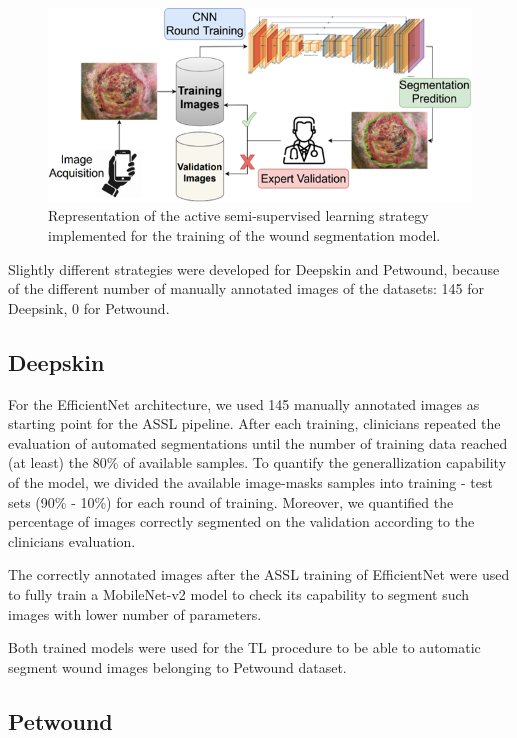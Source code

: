 \documentclass[../main.tex]{subfiles}
\begin{document}
\begin{figure}[H] 
\begin{center}
\includegraphics[width=16cm]{images/ASSL.png}
\caption{\small{Representation of the active semi-supervised learning strategy implemented for the training of the wound segmentation model.}}\label{fig:ASSL}
\end{center}
\end{figure}

Slightly different strategies were developed for Deepskin and Petwound, because of the different number of manually annotated images of the datasets: 145 for Deepsink, 0 for Petwound.

\subsection{Deepskin}

For the EfficientNet architecture, we used 145 manually annotated images as starting point for the ASSL pipeline.
After each training, clinicians repeated the evaluation of automated segmentations until the number of training data reached (at least) the 80\% of available samples.
To quantify the generallization capability of the model, we divided the available image-masks samples into training - test sets (90\% - 10\%) for each round of training.
Moreover, we quantified the percentage of images correctly segmented on the validation according to the clinicians evaluation.

The correctly annotated images after the ASSL training of EfficientNet were used to fully train a MobileNet-v2 model to check its capability to segment such images with lower number of parameters.

Both trained models were used for the TL procedure to be able to automatic segment wound images belonging to Petwound dataset.

\subsection{Petwound}
\end{document}
